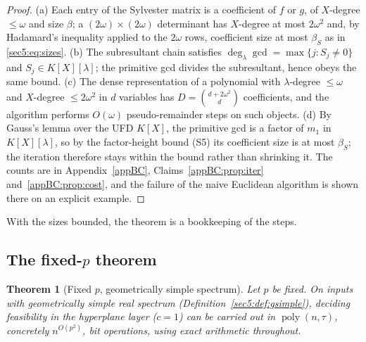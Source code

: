 \documentclass[journal]{IEEEtran}
\theoremstyle{plainn}
\newtheorem{thm}{Theorem}
\theoremstyle{remark}
\newcommand{\poly}{\operatorname{poly}}
\begin{document}
\begin{proof}
(a) Each entry of the Sylvester matrix is a coefficient of $f$ or $g$, of $X$-degree $\le\omega$ and
size $\beta$; a $(2\omega)\times(2\omega)$ determinant has $X$-degree at most $2\omega^{2}$ and, by
Hadamard's inequality applied to the $2\omega$ rows, coefficient size at most $\beta_S$ as in
\eqref{sec5:eq:sizes}. (b) The subresultant chain satisfies $\deg_\lambda\gcd=\max\{j:S_j\neq0\}$ and
$S_j\in K[X][\lambda]$; the primitive gcd divides the subresultant, hence obeys the same bound. (c) The
dense representation of a polynomial with $\lambda$-degree $\le\omega$ and $X$-degree $\le 2\omega^{2}$
in $d$ variables has $D=\binom{d+2\omega^{2}}{d}$ coefficients, and the algorithm performs $O(\omega)$
pseudo-remainder steps on such objects. (d) By Gauss's lemma over the UFD $K[X]$, the primitive gcd is a
factor of $m_1$ in $K[X][\lambda]$, so by the factor-height bound (S5) its coefficient size is at most
$\beta_S$; the iteration therefore stays within the bound rather than shrinking it. The counts are in
Appendix~\ref{appBC}, Claims~\ref{appBC:prop:iter} and~\ref{appBC:prop:cost}, and the failure of
the naive Euclidean algorithm is shown there on an explicit example.
\end{proof}


With the sizes bounded, the theorem is a bookkeeping of the steps.


\subsection{The fixed-\texorpdfstring{$p$}{p} theorem}\label{sec5:sub:main}

\begin{thm}[Fixed $p$, geometrically simple spectrum]\label{sec5:thm:poly}
Let $p$ be fixed. On inputs with geometrically simple real spectrum
(Definition~\ref{sec5:def:gsimple}), deciding feasibility in the hyperplane layer ($c=1$) can be
carried out in $\poly(n,\tau)$, concretely $n^{O(p^{2})}$, bit operations, using exact arithmetic
throughout.
\end{thm}
\end{document}

